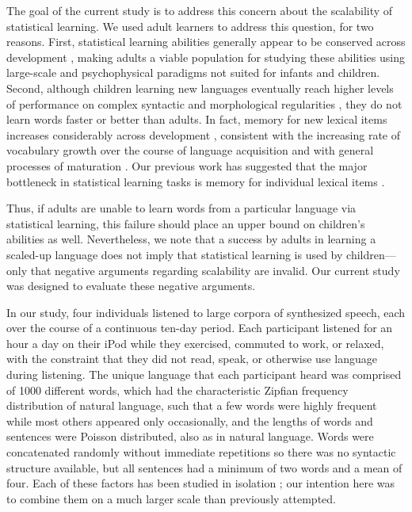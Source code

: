 \documentclass[10pt]{article}
\begin{document}
The goal of the current study is to address this concern about the scalability of statistical learning. We used adult learners to address this question, for two reasons. First, statistical learning abilities generally appear to be conserved across development \cite{saffran1996a,saffran1996b,saffran1997}, making adults a viable population for studying these abilities using large-scale and psychophysical paradigms not suited for infants and children. Second, although children learning new languages eventually reach higher levels of performance on complex syntactic and morphological regularities \cite{johnson1989}, they do not learn words faster or better than adults. In fact, memory for new lexical items increases considerably across development \cite{snow1978,gathercole2004}, consistent with the increasing rate of vocabulary growth over the course of language acquisition \cite{carey1978,bloom2002} and with general processes of maturation \cite{gathercole1999}. Our previous work has suggested that the major bottleneck in statistical learning tasks is memory for individual lexical items \cite{frank2010}. 

Thus, if adults are unable to learn words from a particular language via statistical learning, this failure should place an upper bound on children's abilities as well. Nevertheless, we note that a success by adults in learning a scaled-up language does not imply that statistical learning is used by children---only that negative arguments regarding scalability are invalid. Our current study was designed to evaluate these negative arguments.

In our study, four individuals listened to large corpora of synthesized speech, each over the course of a continuous ten-day period. Each participant listened for an hour a day on their iPod while they exercised, commuted to work, or relaxed, with the constraint that they did not read, speak, or otherwise use language during listening. The unique language that each participant heard was comprised of 1000 different words, which had the characteristic Zipfian frequency distribution of natural language, such that a few words were highly frequent while most others appeared only occasionally, and the lengths of words and sentences were Poisson distributed, also as in natural language. Words were concatenated randomly without immediate repetitions so there was no syntactic structure available, but all sentences had a minimum of two words and a mean of four. Each of these factors has been studied in isolation \cite{frank2010,kurumada2011}; our intention here was to combine them on a much larger scale than previously attempted. 
\end{document}
